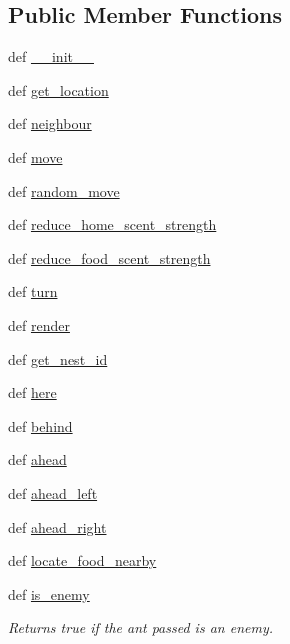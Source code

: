 \subsection*{Public Member Functions}
\begin{DoxyCompactItemize}
\item 
def \hyperlink{classants_1_1Ant_a0fa15b6ba2860b445d390c07bc11d4e2}{\+\_\+\+\_\+init\+\_\+\+\_\+}
\item 
def \hyperlink{classants_1_1Ant_a5ee52d730c2bcbd0cfd0a8cf8d9206c6}{get\+\_\+location}
\item 
def \hyperlink{classants_1_1Ant_a2ddd97dadaa5d24c459b0117dc6e1190}{neighbour}
\item 
def \hyperlink{classants_1_1Ant_a0067159f23e5e9e4b3564d48c1564f11}{move}
\item 
def \hyperlink{classants_1_1Ant_a3a636b900b6fdbed032e3a635495a4c4}{random\+\_\+move}
\item 
def \hyperlink{classants_1_1Ant_a0f92c3c4a37d6c3998bc71fc0a6b9cee}{reduce\+\_\+home\+\_\+scent\+\_\+strength}
\item 
def \hyperlink{classants_1_1Ant_a1d51e32dc22891ded9f02ffc71e612cd}{reduce\+\_\+food\+\_\+scent\+\_\+strength}
\item 
def \hyperlink{classants_1_1Ant_a445ec1d1f8e4cb539c4f66fafa129131}{turn}
\item 
def \hyperlink{classants_1_1Ant_a95585d833c74c56155a0d79394d511cc}{render}
\item 
def \hyperlink{classants_1_1Ant_a10dc42722864d5850912dd34242d5cf8}{get\+\_\+nest\+\_\+id}
\item 
def \hyperlink{classants_1_1Ant_a2e60480b7534b107e12d7f23fd06d5f1}{here}
\item 
def \hyperlink{classants_1_1Ant_a192f8411faa05c48db8db99d033f5d15}{behind}
\item 
def \hyperlink{classants_1_1Ant_ac2c8f048d99cd48a5829ddf7ff4a708a}{ahead}
\item 
def \hyperlink{classants_1_1Ant_a2dbb07eefeecbc51d257f81fb0ba1c71}{ahead\+\_\+left}
\item 
def \hyperlink{classants_1_1Ant_ad7a5311d831e8bcc07061e6a12edad8c}{ahead\+\_\+right}
\item 
def \hyperlink{classants_1_1Ant_af9af7f8a5c766021ef0f68171d09abca}{locate\+\_\+food\+\_\+nearby}
\item 
def \hyperlink{classants_1_1Ant_aeec9c17184393435fd4d4936b6f2736a}{is\+\_\+enemy}
\begin{DoxyCompactList}\small\item\em Returns true if the ant passed is an enemy. \end{DoxyCompactList}\item 

\end{DoxyCompactItemize}
